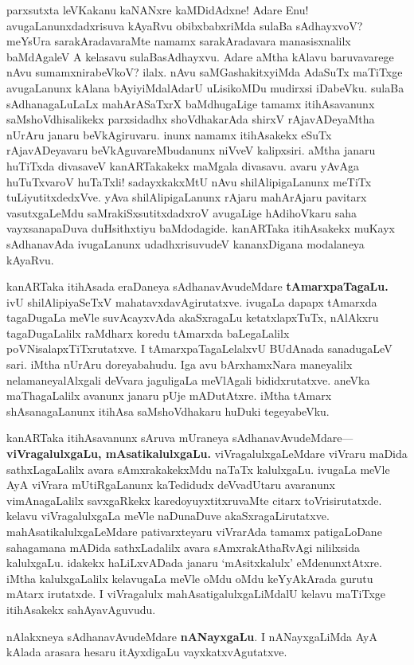 \documentclass[11pt,a4size]{article}
\begin{document}
parxsutxta leVKakanu kaNANxre kaMDidAdxne! Adare Enu!
avugaLanunxdadxrisuva kAyaRvu obibxbabxriMda sulaBa sAdhayxvoV?
meYsUra sarakAradavaraMte namamx sarakAradavara manasisxnalilx
baMdAgaleV A kelasavu sulaBasAdhayxvu. Adare aMtha kAlavu baruvavarege
nAvu sumamxnirabeVkoV? ilalx. nAvu saMGashakitxyiMda AdaSuTx maTiTxge
avugaLanunx kAlana bAyiyiMdalAdarU uLisikoMDu mudirxsi
iDabeVku. sulaBa sAdhanagaLuLaLx mahArASaTxrX baMdhugaLige tamamx
itihAsavanunx saMshoVdhisalikekx parxsidadhx shoVdhakarAda shirxV
rAjavADeyaMtha nUrAru janaru beVkAgiruvaru. inunx namamx itihAsakekx
eSuTx rAjavADeyavaru beVkAguvareMbudanunx niVveV kalipxsiri. aMtha
janaru huTiTxda divasaveV kanARTakakekx maMgala divasavu. avaru yAvAga
huTuTxvaroV huTaTxli! sadayxkakxMtU nAvu shilAlipigaLanunx meTiTx
tuLiyutitxdedxVve. yAva shilAlipigaLanunx rAjaru mahArAjaru pavitarx
vasutxgaLeMdu saMrakiSxsutitxdadxroV avugaLige hAdihoVkaru saha
vayxsanapaDuva duHsithxtiyu baMdodagide. kanARTaka itihAsakekx muKayx
sAdhanavAda ivugaLanunx udadhxrisuvudeV kananxDigana modalaneya
kAyaRvu.

kanARTaka itihAsada eraDaneya sAdhanavAvudeMdare
\textbf{tAmarxpaTagaLu.} ivU shilAlipiyaSeTxV
mahatavxdavAgirutatxve. ivugaLa dapapx tAmarxda tagaDugaLa meVle
suvAcayxvAda akaSxragaLu ketatxlapxTuTx, nAlAkxru tagaDugaLalilx
raMdharx koredu tAmarxda baLegaLalilx poVNisalapxTiTxrutatxve. I
tAmarxpaTagaLelalxvU BUdAnada sanadugaLeV sari. iMtha nUrAru
doreyabahudu. Iga avu bArxhamxNara maneyalilx nelamaneyalAlxgali
deVvara jaguligaLa meVlAgali bididxrutatxve. aneVka maThagaLalilx
avanunx janaru pUje mADutAtxre. iMtha tAmarx shAsanagaLanunx itihAsa
saMshoVdhakaru huDuki tegeyabeVku.

kanARTaka itihAsavanunx sAruva mUraneya
sAdhanavAvudeMdare---\textbf{viVragalulxgaLu, mAsatikalulxgaLu.}
viVragalulxgaLeMdare viVraru maDida sathxLagaLalilx avara
sAmxrakakekxMdu naTaTx kalulxgaLu. ivugaLa meVle AyA viVrara
mUtiRgaLanunx kaTedidudx deVvadUtaru avaranunx vimAnagaLalilx
savxgaRkekx karedoyuyxtitxruvaMte citarx toVrisirutatxde. kelavu
viVragalulxgaLa meVle naDunaDuve
akaSxragaLirutatxve. mahAsatikalulxgaLeMdare pativarxteyaru viVrarAda
tamamx patigaLoDane sahagamana mADida sathxLadalilx avara
sAmxrakAthaRvAgi nililxsida kalulxgaLu. idakekx haLiLxvADada janaru
`mAsitxkalulx' eMdenunxtAtxre. iMtha kalulxgaLalilx kelavugaLa meVle
oMdu oMdu keYyAkArada gurutu mAtarx irutatxde. I viVragalulx
mahAsatigalulxgaLiMdalU kelavu maTiTxge itihAsakekx sahAyavAguvudu.

nAlakxneya sAdhanavAvudeMdare \textbf{nANayxgaLu}. I nANayxgaLiMda AyA
kAlada arasara hesaru itAyxdigaLu vayxkatxvAgutatxve.
\end{document}
